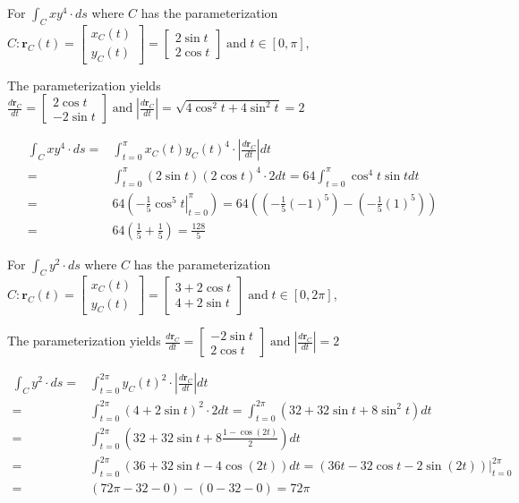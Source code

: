 \documentclass{article}
\newcommand{\abs}[1]{\left|#1\right|}
\newcommand{\at}[1]{\left. #1 \right|}
\newcommand{\dr}[1]{\textcolor{dark_red}{#1}}
\begin{document}
\pagebreak

\begin{framed}
\dr{For \(\int_C xy^4 \cdot ds\) where \(C\) has the parameterization \(C: \mathbf{r}_C(t) = \begin{bmatrix} x_C(t) \\ y_C(t) \end{bmatrix} = \begin{bmatrix} 2\sin t \\ 2\cos t \end{bmatrix} \;\text{and}\; t \in [0,\pi]\),}

\dr{The parameterization yields \(\frac{d\mathbf{r}_C}{dt} = \begin{bmatrix} 2\cos t \\ -2\sin t \end{bmatrix} \;\text{and}\; \abs{\frac{d\mathbf{r}_C}{dt}} = \sqrt{4\cos^2t + 4\sin^2t} = 2\)}

\dr{\begin{align*}
\int_C xy^4 \cdot ds = & \int_{t=0}^\pi x_C(t)y_C(t)^4 \cdot \abs{\frac{d\mathbf{r}_C}{dt}}dt \\
= & \int_{t = 0}^\pi (2\sin t)(2\cos t)^4 \cdot 2dt 
= 64\int_{t = 0}^\pi \cos^4 t \sin t dt \\
= & 64(\at{-\frac{1}{5}\cos^5 t}_{t = 0}^\pi) 
= 64((-\frac{1}{5}(-1)^5) - (-\frac{1}{5}(1)^5)) \\
= & 64(\frac{1}{5} + \frac{1}{5}) = \frac{128}{5}
\end{align*}}
\end{framed}

\begin{framed}
\dr{For \(\int_C y^2 \cdot ds\) where \(C\) has the parameterization \(C: \mathbf{r}_C(t) = \begin{bmatrix} x_C(t) \\ y_C(t) \end{bmatrix} = \begin{bmatrix} 3 + 2\cos t \\ 4 + 2\sin t \end{bmatrix} \;\text{and}\; t \in [0,2\pi]\),}

\dr{The parameterization yields \(\frac{d\mathbf{r}_C}{dt} = \begin{bmatrix} -2\sin t \\ 2\cos t \end{bmatrix} \;\text{and}\; \abs{\frac{d\mathbf{r}_C}{dt}} = 2\)}

\dr{\begin{align*}
\int_C y^2 \cdot ds = & \int_{t=0}^{2\pi} y_C(t)^2 \cdot \abs{\frac{d\mathbf{r}_C}{dt}}dt \\
= & \int_{t = 0}^{2\pi} (4 + 2\sin t)^2 \cdot 2dt 
= \int_{t = 0}^{2\pi} (32 + 32\sin t + 8\sin^2 t)dt \\
= & \int_{t = 0}^{2\pi} (32 + 32\sin t + 8\frac{1 - \cos(2t)}{2})dt \\
= & \int_{t = 0}^{2\pi} (36 + 32\sin t - 4\cos(2t))dt 
= \at{(36t - 32\cos t - 2\sin(2t))}_{t = 0}^{2\pi} \\
= & (72\pi - 32 - 0) - (0 - 32 - 0) = 72\pi
\end{align*}}
\end{framed}
\end{document}
